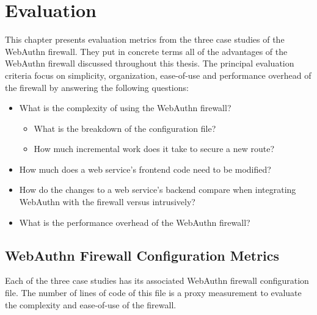 
\chapter{Evaluation}\label{Chap:Evaluation}

This chapter presents evaluation metrics from the three case studies of the WebAuthn firewall. They put in concrete terms all of the advantages of the WebAuthn firewall discussed throughout this thesis. The principal evaluation criteria focus on simplicity, organization, ease-of-use and performance overhead of the firewall by answering the following questions:

\begin{itemize}[nosep]
\item What is the complexity of using the WebAuthn firewall?

  \begin{itemize}[nosep]
    \item What is the breakdown of the configuration file?
    \item How much incremental work does it take to secure a new route?
  \end{itemize}

\item How much does a web service's frontend code need to be modified?

\item How do the changes to a web service's backend compare when integrating WebAuthn with the firewall versus intrusively?

\item What is the performance overhead of the WebAuthn firewall?

\end{itemize}



\section{WebAuthn Firewall Configuration Metrics}

Each of the three case studies has its associated WebAuthn firewall configuration file. The number of lines of code of this file is a proxy measurement to evaluate the complexity and ease-of-use of the firewall. 

